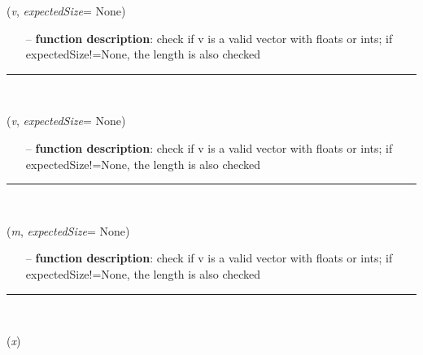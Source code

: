 \begin{itemize}[leftmargin=1.4cm]
\begin{flushleft}
({\it v}, {\it expectedSize}= None)
\end{flushleft}
\setlength{\itemindent}{0.7cm}
\begin{itemize}[leftmargin=0.7cm]
\item[--]
{\bf function description}: check if v is a valid vector with floats or ints; if expectedSize!=None, the length is also checked
\vspace{12pt}\end{itemize}
%
\noindent\rule{8cm}{0.75pt}\vspace{1pt} \\ 
\begin{flushleft}
\label{sec:advancedUtilities:IsIntVector}
({\it v}, {\it expectedSize}= None)
\end{flushleft}
\setlength{\itemindent}{0.7cm}
\begin{itemize}[leftmargin=0.7cm]
\item[--]
{\bf function description}: check if v is a valid vector with floats or ints; if expectedSize!=None, the length is also checked
\vspace{12pt}\end{itemize}
%
\noindent\rule{8cm}{0.75pt}\vspace{1pt} \\ 
\begin{flushleft}
\label{sec:advancedUtilities:IsSquareMatrix}
({\it m}, {\it expectedSize}= None)
\end{flushleft}
\setlength{\itemindent}{0.7cm}
\begin{itemize}[leftmargin=0.7cm]
\item[--]
{\bf function description}: check if v is a valid vector with floats or ints; if expectedSize!=None, the length is also checked
\vspace{12pt}\end{itemize}
%
\noindent\rule{8cm}{0.75pt}\vspace{1pt} \\ 
\begin{flushleft}
\label{sec:advancedUtilities:IsValidObjectIndex}
({\it x})
\end{flushleft}

\end{itemize}
